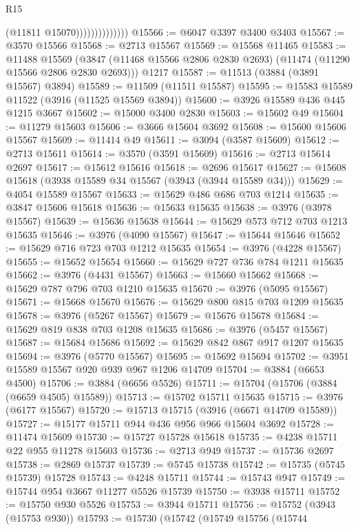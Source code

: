 \begin{lexlean}{R15}
\begin{coremodule}
                              (@11811 @15070))))))))))))))
@15566 := @6047 @3397 @3400 @3403
@15567 := @3570 @15566
@15568 := @2713 @15567
@15569 := @15568 @11465
@15583 := @11488
    @15569
    (@3847 (@11468 @15566 @2806 @2830 @2693) (@11474 (@11290 @15566 @2806 @2830 @2693)))
    @1217
@15587 := @11513 (@3884 (@3891 @15567) @3894)
@15589 := @11509 (@11511 @15587)
@15595 := @15583 @15589 @11522 (@3916 (@11525 @15569 @3894))
@15600 := @3926 @15589 @436 @445 @1215 @3667
@15602 := @15000 @3400 @2830
@15603 := @15602 @49
@15604 := @11279 @15603
@15606 := @3666 @15604 @3692
@15608 := @15600 @15606 @15567
@15609 := @11414 @49
@15611 := @3094 (@3587 @15609)
@15612 := @2713 @15611
@15614 := @3570 (@3591 @15609)
@15616 := @2713 @15614 @2697
@15617 := @15612 @15616
@15618 := @2696 @15617
@15627 := @15608 @15618 (@3938 @15589 @34 @15567 (@3943 (@3944 @15589 @34)))
@15629 := @4054 @15589 @15567
@15633 := @15629 @486 @686 @703 @1214
@15635 := @3847 @15606 @15618
@15636 := @15633 @15635
@15638 := @3976 (@3978 @15567)
@15639 := @15636 @15638
@15644 := @15629 @573 @712 @703 @1213 @15635
@15646 := @3976 (@4090 @15567)
@15647 := @15644 @15646
@15652 := @15629 @716 @723 @703 @1212 @15635
@15654 := @3976 (@4228 @15567)
@15655 := @15652 @15654
@15660 := @15629 @727 @736 @784 @1211 @15635
@15662 := @3976 (@4431 @15567)
@15663 := @15660 @15662
@15668 := @15629 @787 @796 @703 @1210 @15635
@15670 := @3976 (@5095 @15567)
@15671 := @15668 @15670
@15676 := @15629 @800 @815 @703 @1209 @15635
@15678 := @3976 (@5267 @15567)
@15679 := @15676 @15678
@15684 := @15629 @819 @838 @703 @1208 @15635
@15686 := @3976 (@5457 @15567)
@15687 := @15684 @15686
@15692 := @15629 @842 @867 @917 @1207 @15635
@15694 := @3976 (@5770 @15567)
@15695 := @15692 @15694
@15702 := @3951 @15589 @15567 @920 @939 @967 @1206 @14709
@15704 := @3884 (@6653 @4500)
@15706 := @3884 (@6656 @5526)
@15711 := @15704 (@15706 (@3884 (@6659 @4505) @15589))
@15713 := @15702 @15711 @15635
@15715 := @3976 (@6177 @15567)
@15720 := @15713 @15715 (@3916 (@6671 @14709 @15589))
@15727 := @15177 @15711 @944 @436 @956 @966 @15604 @3692
@15728 := @11474 @15609
@15730 := @15727 @15728 @15618
@15735 := @4238 @15711 @22 @955 @11278 @15603
@15736 := @2713 @949
@15737 := @15736 @2697
@15738 := @2869 @15737
@15739 := @5745 @15738
@15742 := @15735 (@5745 @15739) @15728
@15743 := @4248 @15711
@15744 := @15743 @947
@15749 := @15744 @954 @3667 @11277 @5526 @15739
@15750 := @3938 @15711
@15752 := @15750 @930 @5526
@15753 := @3944 @15711
@15756 := @15752 (@3943 (@15753 @930))
@15793 := @15730
    (@15742
      (@15749
        @15756
        (@15744

\end{coremodule}
\end{lexlean}
